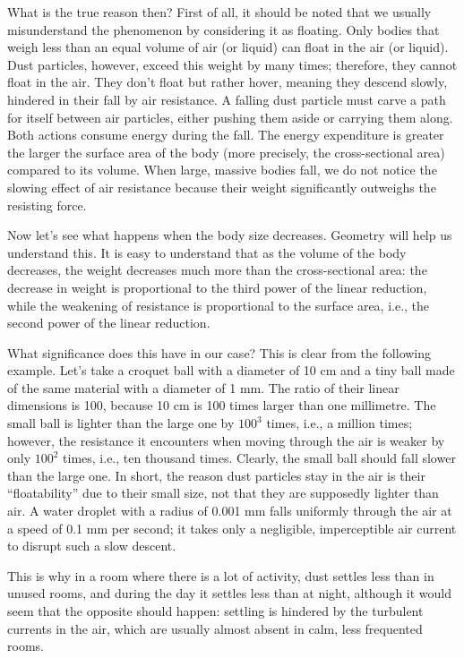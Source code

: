 What is the true reason then? First of all, it should be noted that we usually misunderstand the phenomenon by considering it as floating. Only bodies that weigh less than an equal volume of air (or liquid) can float in the air (or liquid). Dust particles, however, exceed this weight by many times; therefore, they cannot float in the air. They don't float but rather hover, meaning they descend slowly, hindered in their fall by air resistance. A falling dust particle must carve a path for itself between air particles, either pushing them aside or carrying them along. Both actions consume energy during the fall. The energy expenditure is greater the larger the surface area of the body (more precisely, the cross-sectional area) compared to its volume. When large, massive bodies fall, we do not notice the slowing effect of air resistance because their weight significantly outweighs the resisting force.

Now let's see what happens when the body size decreases. Geometry will help us understand this. It is easy to understand that as the volume of the body decreases, the weight decreases much more than the cross-sectional area: the decrease in weight is proportional to the third power of the linear reduction, while the weakening of resistance is proportional to the surface area, i.e., the second power of the linear reduction. 

What significance does this have in our case? This is clear from the following example. Let's take a croquet ball with a diameter of 10 cm and a tiny ball made of the same material with a diameter of 1 mm. The ratio of their linear dimensions is 100, because 10 cm is 100 times larger than one millimetre. The small ball is lighter than the large one by $100^{3}$ times, i.e., a million times; however, the resistance it encounters when moving through the air is weaker by only $100^{2}$ times, i.e., ten thousand times. Clearly, the small ball should fall slower than the large one. In short, the reason dust particles stay in the air is their ``floatability'' due to their small size, not that they are supposedly lighter than air. A water droplet with a radius of 0.001 mm falls uniformly through the air at a speed of 0.1 mm per second; it takes only a negligible, imperceptible air current to disrupt such a slow descent.


This is why in a room where there is a lot of activity, dust settles less than in unused rooms, and during the day it settles less than at night, although it would seem that the opposite should happen: settling is hindered by the turbulent currents in the air, which are usually almost absent in calm, less frequented rooms.

